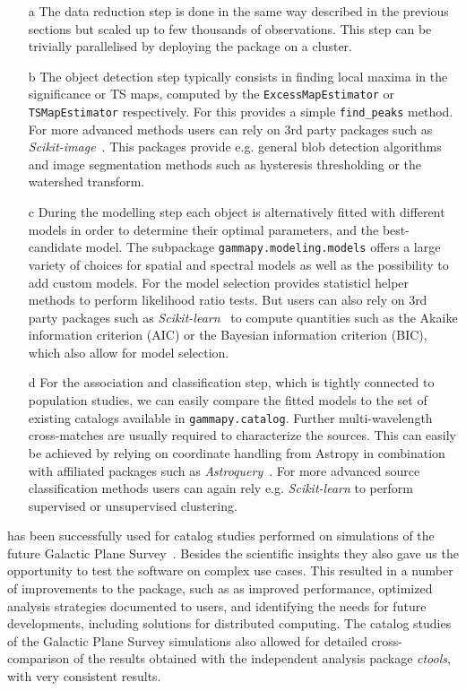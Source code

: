 \documentclass[longauth]{aa}
\newcommand{\code}[1]{\texttt{#1}}
\begin{document}
\begin{itemize}
	\item[a] The \iacts data reduction step is done in the same way described in the 
	previous sections but scaled up to few thousands of observations. This step can be
	trivially parallelised by deploying the \gammapy package on a cluster.
	\item[b] The object detection step typically consists in finding local maxima
	in the significance or TS maps, computed by the \code{ExcessMapEstimator} or
	\code{TSMapEstimator} respectively. For this \gammapy provides a simple \code{find\_peaks}
	method. For more advanced methods users can rely on 3rd party packages such as
	\textit{Scikit-image}~\citep{scikit-image}. This packages provide e.g. general
	blob detection algorithms and image segmentation methods such as hysteresis thresholding
	or the watershed transform. 	
	\item[c] During the modelling step each object is alternatively fitted with different
	models in order to determine their optimal parameters, and the best-candidate model. The
	subpackage \code{gammapy.modeling.models} offers a large variety of choices for spatial
	and spectral models as well as the possibility to add custom models. For the model selection
	\gammapy provides statisticl helper methods to perform likelihood ratio tests.
	But users can also rely on 3rd party packages such as \textit{Scikit-learn}~\citep{scikit-learn}
	to compute quantities such as the Akaike information criterion (AIC) or the Bayesian
	information criterion (BIC), which also allow for model selection.
	\item[d] For the association and classification step, which is tightly connected to
	population studies, we can easily compare the fitted models to the set of
	existing \gammaray catalogs available in \code{gammapy.catalog}. Further
	multi-wavelength cross-matches are usually required to characterize the
	sources. This can easily be achieved by relying on coordinate
	handling from Astropy in combination with affiliated packages such as
	\textit{Astroquery}~\citep{astroquery}. For more advanced source classification
	methods users can again rely e.g. \textit{Scikit-learn} to perform supervised
	or unsupervised clustering.
\end{itemize}

\gammapy has been successfully used for catalog studies performed on simulations
of the future \cta Galactic Plane Survey~\citep{Remy2021}. Besides the scientific
insights they also gave us the opportunity to test the \gammapy software on complex
use cases. This resulted in a number of improvements to the \gammapy package, such as
as improved performance, optimized analysis strategies documented to users, and
identifying the needs for future developments, including solutions for distributed
computing. The catalog studies of the \cta Galactic Plane Survey simulations
also allowed for detailed cross-comparison of the results obtained with the independent
\gammaray analysis package \textit{ctools}\citep{2016A&A...593A...1K}, with very consistent 
results.
\end{document}
